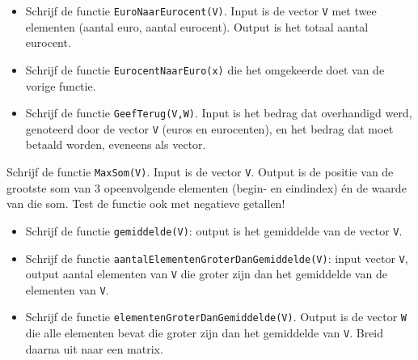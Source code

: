 \begin{oef}
\begin{itemize}
  \item Schrijf de functie \verb/EuroNaarEurocent(V)/. Input is de vector \verb/V/ met twee elementen (aantal euro, aantal eurocent). Output is het totaal aantal eurocent.
  \item Schrijf de functie \verb/EurocentNaarEuro(x)/ die het omgekeerde doet van de vorige functie.
  \item Schrijf de functie \verb/GeefTerug(V,W)/. Input is het bedrag dat overhandigd werd, genoteerd door de vector \verb/V/ (euros en eurocenten), en het bedrag dat moet betaald worden, eveneens als vector.
\end{itemize}
\begin{opl}
\end{opl}
\end{oef}

\begin{oef}
Schrijf de functie \verb/MaxSom(V)/. Input is de vector \verb/V/. Output is de positie van de grootste som
van 3 opeenvolgende elementen (begin- en eindindex) \'en de waarde van die som. Test de functie ook met negatieve getallen!
\begin{opl}
\end{opl}
\end{oef}

\begin{oef}
\begin{itemize}
  \item Schrijf de functie \verb/gemiddelde(V)/: output is het gemiddelde van de vector \verb/V/.
  \item Schrijf de functie \verb/aantalElementenGroterDanGemiddelde(V)/: input vector \verb/V/, output aantal elementen van \verb/V/ die groter zijn dan het gemiddelde van de elementen van \verb/V/.
  \item Schrijf de functie \verb/elementenGroterDanGemiddelde(V)/. Output is de vector \verb/W/ die alle elementen bevat die groter zijn dan het gemiddelde van \verb/V/. Breid daarna uit naar een matrix.
\end{itemize}
\begin{opl}
\end{opl}
\end{oef}

